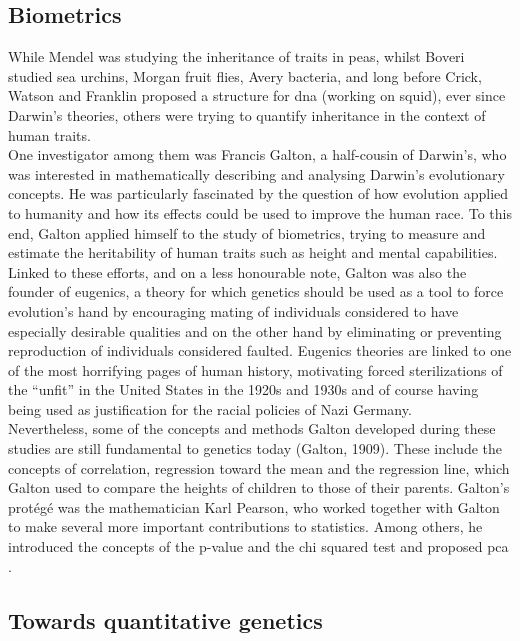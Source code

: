 \subsection{Biometrics} %
While Mendel was studying the inheritance of traits in peas, whilst Boveri studied sea urchins, Morgan fruit flies, Avery bacteria, and long before Crick, Watson and Franklin proposed a structure for \gls{dna} (working on squid), ever since Darwin’s theories, others were trying to quantify inheritance in the context of human traits.\\ 

One investigator among them was Francis Galton, a half-cousin of Darwin’s, who was interested in mathematically describing and analysing Darwin’s evolutionary concepts. 
He was particularly fascinated by the question of how evolution applied to humanity and how its effects could be used to improve the human race. 
To this end, Galton applied himself to the study of biometrics, trying to measure and estimate the heritability of human traits such as height and mental capabilities.\\ 

Linked to these efforts, and on a less honourable note, Galton was also the founder of eugenics, a theory for which genetics should be used as a tool to force evolution’s hand by encouraging mating of individuals considered to have especially desirable qualities and on the other hand by eliminating or preventing reproduction of individuals considered faulted. Eugenics theories are linked to one of the most horrifying pages of human history, motivating forced sterilizations of the “unfit” in the United States in the 1920s and 1930s and of course having being used as justification for the racial policies of Nazi Germany.\\ 

Nevertheless, some of the concepts and methods Galton developed during these studies are still fundamental to genetics today (Galton, 1909). 
These include the concepts of correlation, regression toward the mean and the regression line, which Galton used to compare the heights of children to those of their parents. Galton’s protégé was the mathematician Karl Pearson, who worked together with Galton to make several more important contributions to statistics. Among others, he introduced the concepts of the p-value and the chi squared test \cite{pearson1900x} and proposed \gls{pca} \cite{pearson1901liii}.

\subsection{Towards quantitative genetics} %

